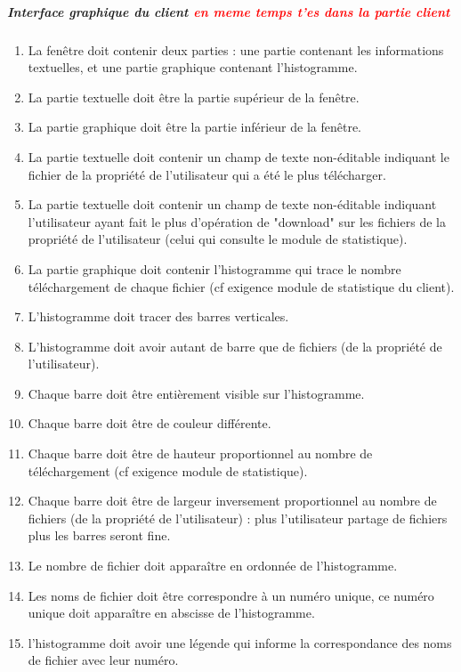 \documentclass[10pt,a4paper]{report}
\begin{document}
	\subparagraph{Interface graphique du client \textcolor{red}{en meme temps t'es dans la partie client}}
		\begin{enumerate}

			\item La fenêtre doit contenir deux parties : une partie contenant les informations textuelles, et une partie graphique contenant l'histogramme.

			\item La partie textuelle doit être la partie supérieur de la fenêtre.

			\item La partie graphique doit être la partie inférieur de la fenêtre.

			\item La partie textuelle doit contenir un champ de texte non-éditable indiquant le fichier de la propriété de l'utilisateur qui a été le plus télécharger.

			\item La partie textuelle doit contenir un champ de texte non-éditable indiquant l'utilisateur ayant fait le plus d'opération de "download" sur les fichiers de la propriété de l'utilisateur (celui qui consulte le module de statistique).

			\item La partie graphique doit contenir l'histogramme qui trace le nombre téléchargement de chaque fichier (cf exigence module de statistique du client).

			\item L'histogramme doit tracer des barres verticales.

			\item L'histogramme doit avoir autant de barre que de fichiers (de la propriété de l'utilisateur).

			\item Chaque barre doit être entièrement visible sur l'histogramme.

			\item Chaque barre doit être de couleur différente.

			\item Chaque barre doit être de hauteur proportionnel au nombre de téléchargement (cf exigence module de statistique).

			\item Chaque barre doit être de largeur inversement proportionnel au nombre de fichiers (de la propriété de l'utilisateur) : plus l'utilisateur partage de fichiers plus les barres seront fine.

			\item Le nombre de fichier doit apparaître en ordonnée de l'histogramme.

			\item Les noms de fichier doit être correspondre à un numéro unique, ce numéro unique doit apparaître en abscisse de l'histogramme.

			\item l'histogramme doit avoir une légende qui informe la correspondance des noms de fichier avec leur numéro.
		\end{enumerate}
\end{document}
